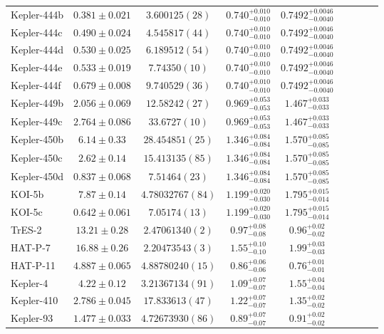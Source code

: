 \documentclass[a4paper,fleqn,usenatbib]{mnras}
\begin{document}
\begin{table*}
\begin{tabular}{lcccccccc}
Kepler-444b   &	$0.381 \pm 0.021$	&$3.600125 (28)$	&$0.740_{-0.010}^{+0.010}$	&$0.7492_{-0.0040}^{+0.0046}$\\
Kepler-444c&	$0.490 \pm 0.024$	&$4.545817 (44)$	&$0.740_{-0.010}^{+0.010}$	&$0.7492_{-0.0040}^{+0.0046}$\\
Kepler-444d &	$0.530 \pm 0.025$	&$6.189512 (54)$	&$0.740_{-0.010}^{+0.010}$	&$0.7492_{-0.0040}^{+0.0046}$\\
Kepler-444e &	$0.533 \pm 0.019$	&$7.74350 (10)$		&$0.740_{-0.010}^{+0.010}$	&$0.7492_{-0.0040}^{+0.0046}$\\
Kepler-444f &	$0.679 \pm 0.008$	&$9.740529 (36)$	&$0.740_{-0.010}^{+0.010}$	&$0.7492_{-0.0040}^{+0.0046}$\\	   
Kepler-449b&	$2.056 \pm 0.069$	&$12.58242 (27)$	&$0.969_{-0.053}^{+0.053}$	&$1.467_{-0.033}^{+0.033}$	\\
Kepler-449c&	$2.764 \pm 0.086$	&$33.6727 (10)$		&$0.969_{-0.053}^{+0.053}$	&$1.467_{-0.033}^{+0.033}$	\\
Kepler-450b   &	$6.14 \pm 0.33$	    &$28.454851 (25)$	&$1.346_{-0.084}^{+0.084}$	&$1.570_{-0.085}^{+0.085}$	\\
Kepler-450c   &	$2.62 \pm 0.14$ 	&$15.413135 (85)$	&$1.346_{-0.084}^{+0.084}$	&$1.570_{-0.085}^{+0.085}$	\\
Kepler-450d   &	$0.837 \pm 0.068$	&$7.51464 (23)$		&$1.346_{-0.084}^{+0.084}$	&$1.570_{-0.085}^{+0.085}$	\\
KOI-5b      &	$7.87 \pm 0.14$   	&$4.78032767 (84)$	&$1.199_{-0.030}^{+0.020}$	&$1.795_{-0.014}^{+0.015}$	\\
KOI-5c      &	$0.642 \pm 0.061$	&$7.05174 (13)$		&$1.199_{-0.030}^{+0.020}$	&$1.795_{-0.014}^{+0.015}$	\\
TrES-2&	    $13.21 \pm 0.28$	&$ 2.47061340 (2) $    	&$0.97^{+0.08}_{-0.08}$	&$0.96^{+0.02}_{-0.02}$	\\
HAT-P-7&	$16.88 \pm 0.26$	&$ 2.20473543 (3) $    	&$1.55^{+0.10}_{-0.10}$	&$1.99^{+0.03}_{-0.03}$	\\
HAT-P-11&	$4.887 \pm 0.065$	&$ 4.88780240 (15)$  	&$0.86^{+0.06}_{-0.06}$	&$0.76^{+0.01}_{-0.01}$	\\
Kepler-4&	$4.22 \pm 0.12$   	&$ 3.21367134 (91)$    	&$1.09^{+0.07}_{-0.07}$	&$1.55^{+0.04}_{-0.04}$	\\
Kepler-410&	$2.786 \pm 0.045$	&$17.833613 (47) $    	&$1.22^{+0.07}_{-0.07}$	&$1.35^{+0.02}_{-0.02}$	\\
Kepler-93&	$1.477 \pm 0.033$	&$ 4.72673930 (86)$    	&$0.89^{+0.07}_{-0.07}$	&$0.91^{+0.02}_{-0.02}$	\\

\end{tabular}
\end{table*}
\end{document}
